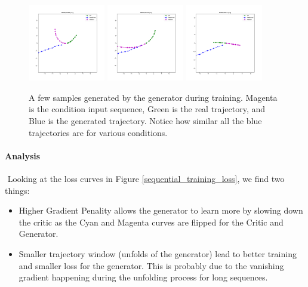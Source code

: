 \documentclass{article}
\begin{document}
\begin{figure}
    \centering
    \includegraphics[width=0.3\textwidth]{mode_collapse0}
    \includegraphics[width=0.3\textwidth]{mode_collapse1}
    \includegraphics[width=0.3\textwidth]{mode_collapse2}\\
    \caption{A few samples generated by the generator during training. Magenta is the condition input sequence, Green is the real trajectory, and Blue is the generated trajectory. Notice how similar all the blue trajectories are for various conditions.}
    \label{sample_mode_collapse}
\end{figure}

\paragraph{Analysis}$ $
Looking at the loss curves in Figure \ref{sequential_training_loss}, we find two things:
\begin{itemize}
\item Higher Gradient Penality allows the generator to learn more by slowing down the critic as the Cyan and Magenta curves are flipped for the Critic and Generator.
\item Smaller trajectory window (unfolds of the generator) lead to better training and smaller loss for the generator.  This is probably due to the vanishing gradient happening during the unfolding process for long sequences.
\end{itemize}
\end{document}
